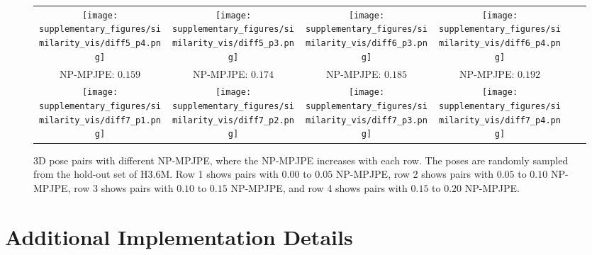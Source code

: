 \begin{figure*}[!t]
\begin{tabular}{cccccc}
\texttt{[image: supplementary\_figures/similarity\_vis/diff5\_p4.png]}\hspace{\fighspace} & \texttt{[image: supplementary\_figures/similarity\_vis/diff5\_p3.png]}\hspace{\fighspacer} & \texttt{[image: supplementary\_figures/similarity\_vis/diff6\_p3.png]}\hspace{\fighspace} & \texttt{[image: supplementary\_figures/similarity\_vis/diff6\_p4.png]}\hspace{\fighspacer} \\


\scriptsize{NP-MPJPE: $0.159$} & \scriptsize{NP-MPJPE: $0.174$}\hspace{\fighspace} & \scriptsize{NP-MPJPE: $0.185$} & \scriptsize{NP-MPJPE: $0.192$}\hspace{\fighspace} \\

\texttt{[image: supplementary\_figures/similarity\_vis/diff7\_p1.png]}\hspace{\fighspace} & \texttt{[image: supplementary\_figures/similarity\_vis/diff7\_p2.png]}\hspace{\fighspacer} & \texttt{[image: supplementary\_figures/similarity\_vis/diff7\_p3.png]}\hspace{\fighspace} & \texttt{[image: supplementary\_figures/similarity\_vis/diff7\_p4.png]}\hspace{\fighspacer} \\



\end{tabular}
\caption{3D pose pairs with different NP-MPJPE, where the NP-MPJPE increases with each row. The poses are randomly sampled from the hold-out set of H3.6M. Row 1 shows pairs with $0.00$ to $0.05$ NP-MPJPE, row 2 shows pairs with $0.05$ to $0.10$ NP-MPJPE, row 3 shows pairs with $0.10$ to $0.15$ NP-MPJPE, and row 4 shows pairs with $0.15$ to $0.20$ NP-MPJPE.}
\label{fig:supp_similarity}
\vspace{-0.2cm}
\end{figure*}
 
\section{Additional Implementation Details}\label{sec:implementation_details}

